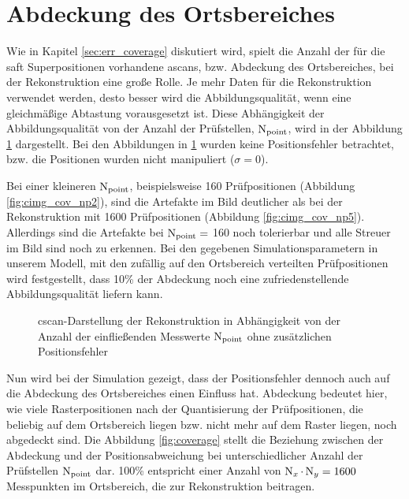

\section{Abdeckung des Ortsbereiches} \label{sec:posscan_coverage}
Wie in Kapitel \ref{sec:err_coverage} diskutiert wird, spielt die Anzahl der für die \acrshort{saft} Superpositionen vorhandene \glspl{ascan}, bzw. Abdeckung des Ortsbereiches, bei der Rekonstruktion eine große Rolle. Je mehr Daten für die Rekonstruktion verwendet werden, desto besser wird die Abbildungsqualität, wenn eine gleichmäßige Abtastung vorausgesetzt  ist. Diese Abhängigkeit der Abbildungsqualität von der Anzahl der Prüfstellen, $\operatorname{N}_{\operatorname{point}}$, wird in der Abbildung \ref{fig:cimg_cov_np_all} dargestellt. Bei den Abbildungen in \ref{fig:cimg_cov_np_all} wurden keine Positionsfehler betrachtet, bzw. die Positionen wurden nicht manipuliert ($\sigma = 0$). \par
Bei einer kleineren $\operatorname{N}_{\operatorname{point}}$, beispielsweise 160 Prüfpositionen (Abbildung \ref{fig:cimg_cov_np2}), sind die Artefakte im Bild deutlicher als bei der Rekonstruktion mit 1600 Prüfpositionen (Abbildung \ref{fig:cimg_cov_np5}). Allerdings sind die Artefakte bei $\operatorname{N}_{\operatorname{point}} =$ 160 noch tolerierbar und alle Streuer im Bild sind noch zu erkennen. Bei den gegebenen Simulationsparametern in unserem Modell, mit den zufällig auf den Ortsbereich verteilten Prüfpositionen wird festgestellt, dass 10\% der Abdeckung noch eine zufriedenstellende Abbildungsqualität liefern kann. \par
\begin{figure}[h!]
\begin{center}

\caption[Abhängigkeit der Abbildungsqualität von der Anzahl der Prüfstellen]{\gls{cscan}-Darstellung der Rekonstruktion in Abhängigkeit von der Anzahl der einfließenden Messwerte $\operatorname{N}_{\operatorname{point}}$ ohne zusätzlichen Positionsfehler}
\label{fig:cimg_cov_np_all}
\end{center}
\end{figure}
Nun wird bei der Simulation gezeigt, dass der Positionsfehler dennoch auch auf die Abdeckung des Ortsbereiches einen Einfluss hat. Abdeckung bedeutet hier, wie viele Rasterpositionen nach der Quantisierung der Prüfpositionen, die beliebig auf dem Ortsbereich liegen bzw. nicht mehr auf dem Raster liegen, noch abgedeckt sind. Die Abbildung \ref{fig:coverage} stellt die Beziehung zwischen der Abdeckung und der Positionsabweichung bei unterschiedlicher Anzahl der Prüfstellen $\operatorname{N}_{\operatorname{point}}$ dar. 100\% entspricht einer Anzahl von $\operatorname{N}_{x} \cdot \operatorname{N}_{y} = 1600$ Messpunkten im Ortsbereich, die zur Rekonstruktion beitragen. \par 
